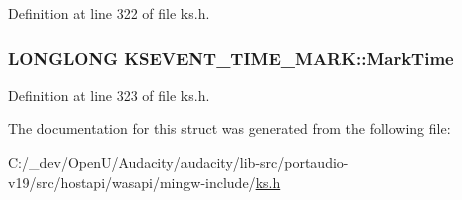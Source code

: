 Definition at line 322 of file ks.\+h.

\subsubsection[{\texorpdfstring{Mark\+Time}{MarkTime}}]{\setlength{\rightskip}{0pt plus 5cm}L\+O\+N\+G\+L\+O\+NG K\+S\+E\+V\+E\+N\+T\+\_\+\+T\+I\+M\+E\+\_\+\+M\+A\+R\+K\+::\+Mark\+Time}\hypertarget{struct_k_s_e_v_e_n_t___t_i_m_e___m_a_r_k_a99954f7ba2df2f168051a514bfb03b66}{}\label{struct_k_s_e_v_e_n_t___t_i_m_e___m_a_r_k_a99954f7ba2df2f168051a514bfb03b66}


Definition at line 323 of file ks.\+h.



The documentation for this struct was generated from the following file\+:\begin{DoxyCompactItemize}
\item 
C\+:/\+\_\+dev/\+Open\+U/\+Audacity/audacity/lib-\/src/portaudio-\/v19/src/hostapi/wasapi/mingw-\/include/\hyperlink{ks_8h}{ks.\+h}\end{DoxyCompactItemize}
